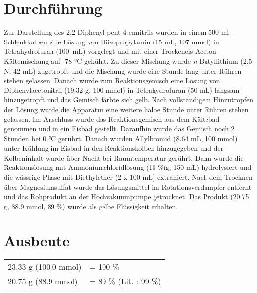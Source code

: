 \documentclass[12pt]{article}
\begin{document}
\begin{onehalfspace}
\normalsize \section{Durchführung \cite{vor}}
Zur Darstellung des 2,2-Diphenyl-pent-4-ennitrils wurden in einem 500 ml-Schlenkkolben eine Lösung von
Diisopropylamin (15 \si{\milli\liter}, 107 \si{\milli\mol}) in Tetrahydrofuran (100~\si{\milli\liter}) vorgelegt
und mit einer Trockeneis-Aceton-Kältemischung auf -78 \si{\celsius} gekühlt. Zu dieser Mischung wurde \textit{n}-Butyllithium (2.5 N, 42 \si{\milli\liter})
zugetropft und die Mischung wurde eine Stunde lang unter Rühren stehen gelassen. Danach
wurde zum Reaktionsgemisch eine Lösung von Diphenylacetonitril (19.32 \si{\gram}, 100 \si{\milli\mol}) in Tetrahydrofuran (50 \si{\milli\liter}) langsam hinzugetropft
und das Gemisch färbte sich gelb. Nach vollständigem Hinzutropfen der Lösung wurde die Apparatur eine weitere halbe Stunde unter Rühren stehen gelassen.
Im Anschluss wurde das Reaktionsgemisch aus dem Kältebad genommen und in ein Eisbad gestellt.
Daraufhin wurde das Gemisch noch 2 Stunden bei 0 \si{\celsius} gerührt.
Danach wurden Allylbromid (8.64 \si{\milli\liter}, 100 \si{\milli\mol}) unter Kühlung im Eisbad in den Reaktionskolben hinzugegeben
und der Kolbeninhalt wurde über Nacht bei Raumtemperatur gerührt.
Dann wurde die Reaktionslösung mit Ammoniumchloridlösung (10 \%ig, 150 \si{\milli\liter}) hydrolysiert und die wässrige Phase mit Diethylether (2 x 100 \si{\milli\liter}) extrahiert.
Nach dem Trocknen über Magnesiumsulfat wurde das Lösungsmittel im Rotationsverdampfer entfernt und
 das Rohprodukt an der Hochvakuumpumpe getrocknet. Das Produkt (20.75 g, 88.9 mmol, 89 \%) wurde als gelbe Flüssigkeit erhalten.
\section{Ausbeute}
\begin{tabular}{ ll}
  23.33 g (100.0 mmol)   & = 100 \%\\
  20.75 g (88.9 mmol)    & = 89 \% (Lit.\cite{vor} : 99 \%) \\
 \end{tabular}
 \pagebreak

\end{onehalfspace}
\end{document}
